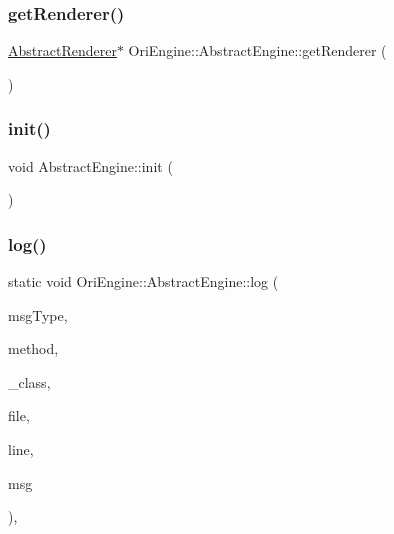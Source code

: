\hypertarget{class_ori_engine_1_1_abstract_engine_a06eb88e86a88b9dbd392b6a789a3d91e}{}\label{class_ori_engine_1_1_abstract_engine_a06eb88e86a88b9dbd392b6a789a3d91e} 
\subsubsection{\texorpdfstring{get\+Renderer()}{getRenderer()}}
{\footnotesize\ttfamily \hyperlink{class_ori_engine_1_1_abstract_renderer}{Abstract\+Renderer}$\ast$ Ori\+Engine\+::\+Abstract\+Engine\+::get\+Renderer (\begin{DoxyParamCaption}{ }\end{DoxyParamCaption})\hspace{0.3cm}{\ttfamily [inline]}}

\hypertarget{class_ori_engine_1_1_abstract_engine_ad969514426afbd6818caea13a538c565}{}\label{class_ori_engine_1_1_abstract_engine_ad969514426afbd6818caea13a538c565} 
\subsubsection{\texorpdfstring{init()}{init()}}
{\footnotesize\ttfamily void Abstract\+Engine\+::init (\begin{DoxyParamCaption}{ }\end{DoxyParamCaption})}

\hypertarget{class_ori_engine_1_1_abstract_engine_a03fcd9fd70108afd53924b0f9d2724a3}{}\label{class_ori_engine_1_1_abstract_engine_a03fcd9fd70108afd53924b0f9d2724a3} 
\subsubsection{\texorpdfstring{log()}{log()}}
{\footnotesize\ttfamily static void Ori\+Engine\+::\+Abstract\+Engine\+::log (\begin{DoxyParamCaption}\item[{\hyperlink{class_ori_engine_1_1_debug_logger_a3ac0c97517b3aecb4ea7bdb5b98e6fe5}{Debug\+Logger\+::\+Msg\+Type}}]{msg\+Type,  }\item[{std\+::string}]{method,  }\item[{std\+::string}]{\+\_\+class,  }\item[{std\+::string}]{file,  }\item[{int}]{line,  }\item[{std\+::string}]{msg }\end{DoxyParamCaption})\hspace{0.3cm}{\ttfamily [inline]}, {\ttfamily [static]}}

